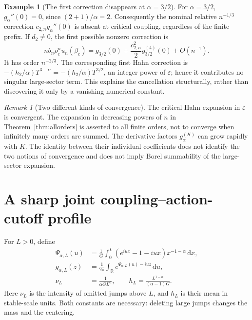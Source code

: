 \documentclass[11pt,a4paper]{article}
\numberwithin{equation}{section}
\theoremstyle{definition}
\newtheorem{example}[theorem]{Example}
\theoremstyle{remark}
\newtheorem{remark}[theorem]{Remark}
\newcommand{\R}{\mathbb R}
\newcommand{\dd}{\,\mathrm d}
\newcommand{\bc}{\beta_{\mathrm c}}
\newcommand{\rhoc}{\rho_{\mathrm c}}
\begin{document}
\begin{example}[The first correction disappears at $\alpha=3/2$]
\label{ex:threehalves}
For $\alpha=3/2$, $g_\alpha''(0)=0$, since $(2+1)/\alpha=2$.
Consequently the nominal relative $n^{-1/3}$ correction
$c_{2,n}g_\alpha''(0)$ is absent at critical coupling, regardless of the
finite prefix. If $d_2\ne0$, the first possible nonzero correction is
\begin{equation}\label{eq:threehalf-correction}
 n b_n\rhoc^n u_n(\bc)
  =g_{3/2}(0)+\frac{c_{2,n}^2}{2}g_{3/2}^{(4)}(0)+O(n^{-1}).
\end{equation}
It has order $n^{-2/3}$. The corresponding first Hahn correction is
$-(h_2/\alpha)T^{3-\alpha}=-(h_2/\alpha)T^{3/2}$, an integer power of
$\varepsilon$; hence it contributes no singular large-sector term.
This explains the cancellation structurally, rather than discovering it
only by a vanishing numerical constant.
\end{example}

\begin{remark}[Two different kinds of convergence]
The critical Hahn expansion in $\varepsilon$ is convergent. The expansion
in decreasing powers of $n$ in Theorem~\ref{thm:allorders} is asserted to
all finite orders, not to converge when infinitely many orders are summed.
The derivative factors $g_\alpha^{(K)}$ can grow rapidly with $K$.
The identity between their individual coefficients does not identify the
two notions of convergence and does not imply Borel summability of the
large-sector expansion.
\end{remark}

\section{A sharp joint coupling--action-cutoff profile}
\label{sec:cutoff}

For $L>0$, define
\begin{align}
 \Psi_{\alpha,L}(u)
 &=\frac1G\int_0^L(e^{iux}-1-iux)x^{-1-\alpha}\dd x,
       \label{eq:truncated-exponent}\\
 g_{\alpha,L}(z)
 &=\frac1{2\pi}\int_\R e^{\Psi_{\alpha,L}(u)-iuz}\dd u,
       \label{eq:truncated-density}\\
 \nu_L&=\frac1{\alpha G L^\alpha},\qquad
 h_L=\frac{L^{1-\alpha}}{(\alpha-1)G}.
       \label{eq:tail-constants}
\end{align}
Here $\nu_L$ is the intensity of omitted jumps above $L$, and $h_L$ is
their mean in stable-scale units. Both constants are necessary: deleting
large jumps changes the mass and the centering.
\end{document}
